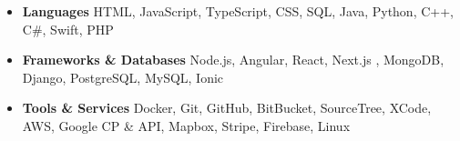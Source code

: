 \documentclass[letterpaper,11pt]{article}[leftmargin=*]
\def \entryspacing {-0pt}
\renewcommand{\section}[2]{\vspace{5pt}
  \tcbox[on line,boxsep=0pt,left=2pt,right=2pt,top=2pt,bottom=2pt,colback=secondary]
  {\color{white}\raggedbottom\normalsize\textbf{{#1}{\hspace{7pt}#2}}}
}
\newcommand{\resumeEntryStart}{\begin{itemize}[leftmargin=2.5mm]}
\newcommand{\resumeEntryEnd}{\end{itemize}\vspace{\entryspacing}}
\newcommand{\resumeEntryS}[2]{
  \item[]\small{
    \textbf{\color{primary}#1 }{ #2 \vspace{-6pt}}
  }
}
\begin{document}
\section{\faGears}{Skills}
 \resumeEntryStart
  \resumeEntryS{Languages} {HTML, JavaScript, TypeScript, CSS, SQL, Java, Python, C++, C\#, Swift, PHP}
  \resumeEntryS{Frameworks \& Databases} {Node.js, Angular, React, Next.js , MongoDB, Django, PostgreSQL, MySQL, Ionic}
  \resumeEntryS{Tools \& Services} {Docker, Git, GitHub, BitBucket, SourceTree, XCode, AWS, Google CP \& API, Mapbox, Stripe, Firebase, Linux}
 \resumeEntryEnd
\end{document}
